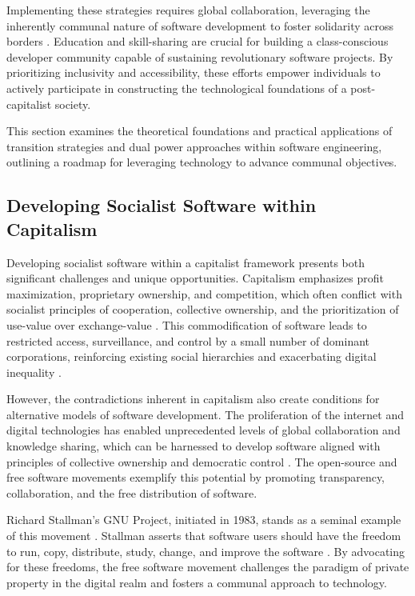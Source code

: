 \begin{refsection}
Implementing these strategies requires global collaboration, leveraging the inherently communal nature of software development to foster solidarity across borders \cite[pp.~136-138]{hardt_negri_multitude}. Education and skill-sharing are crucial for building a class-conscious developer community capable of sustaining revolutionary software projects. By prioritizing inclusivity and accessibility, these efforts empower individuals to actively participate in constructing the technological foundations of a post-capitalist society.

This section examines the theoretical foundations and practical applications of transition strategies and dual power approaches within software engineering, outlining a roadmap for leveraging technology to advance communal objectives.

\subsection{Developing Socialist Software within Capitalism}

Developing socialist software within a capitalist framework presents both significant challenges and unique opportunities. Capitalism emphasizes profit maximization, proprietary ownership, and competition, which often conflict with socialist principles of cooperation, collective ownership, and the prioritization of use-value over exchange-value \cite[pp.~75-77]{Marx2011}. This commodification of software leads to restricted access, surveillance, and control by a small number of dominant corporations, reinforcing existing social hierarchies and exacerbating digital inequality \cite[pp.~488-491]{Marx2008}.

However, the contradictions inherent in capitalism also create conditions for alternative models of software development. The proliferation of the internet and digital technologies has enabled unprecedented levels of global collaboration and knowledge sharing, which can be harnessed to develop software aligned with principles of collective ownership and democratic control \cite[pp.~29-32]{Lessig2004}. The open-source and free software movements exemplify this potential by promoting transparency, collaboration, and the free distribution of software.

Richard Stallman's GNU Project, initiated in 1983, stands as a seminal example of this movement \cite[pp.~33-35]{Stallman2010}. Stallman asserts that software users should have the freedom to run, copy, distribute, study, change, and improve the software \cite[pp.~41-42]{Stallman2010}. By advocating for these freedoms, the free software movement challenges the paradigm of private property in the digital realm and fosters a communal approach to technology.


\end{refsection}
